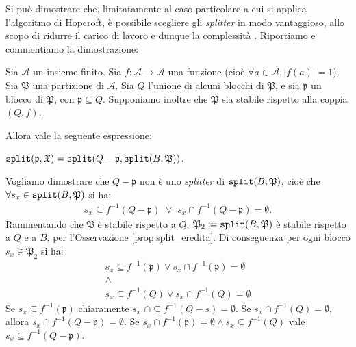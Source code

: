 Si può dimostrare che, limitatamente al caso particolare a cui si applica l'algoritmo di Hopcroft, è possibile scegliere gli \emph{splitter} in modo vantaggioso, allo scopo di ridurre il carico di lavoro e dunque la complessità \cite{hopcroft}. Riportiamo e commentiamo la dimostrazione:
\begin{proposition}
    \label{prop:process_smaller_half}
    Sia $\mathcal{A}$ un insieme finito. Sia $f : \mathcal{A} \to \mathcal{A}$ una funzione (cioè $\forall a \in \mathcal{A}, |f({a})| = 1$). Sia $\mathfrak{P}$ una partizione di $\mathcal{A}$. Sia $Q$ l'unione di alcuni blocchi di $\mathfrak{P}$, e sia $\mathfrak{p}$ un blocco di $\mathfrak{P}$, con $\mathfrak{p} \subseteq Q$. Supponiamo inoltre che $\mathfrak{P}$ sia stabile rispetto alla coppia $(Q, f)$.

    Allora vale la seguente espressione:
    \begin{center}
        $\texttt{\textup{split}}(\mathfrak{p},\mathfrak{X}) = \texttt{\textup{split}}(Q - \mathfrak{p}, \texttt{\textup{split}}(B,\mathfrak{P}))$.
    \end{center}
\end{proposition}
\begin{proof2}
    Vogliamo dimostrare che $Q - \mathfrak{p}$ non è uno \emph{splitter} di $\texttt{\textup{split}}(B,\mathfrak{P})$, cioè che $\forall s_x \in \texttt{\textup{split}}(B,\mathfrak{P})$ si ha:
    \begin{gather*}
        s_x \subseteq f^{-1}(Q - \mathfrak{p}) \,\,\lor\,\, s_x \cap f^{-1}(Q - \mathfrak{p}) = \emptyset.
    \end{gather*}
    Rammentando che $\mathfrak{P}$ è stabile rispetto a $Q$, $\mathfrak{P}_2 \coloneqq \texttt{\textup{split}}(B,\mathfrak{P})$ è stabile rispetto a $Q$ e a $B$, per l'Osservazione \ref{prop:split_eredita}. Di conseguenza per ogni blocco $s_x \in \mathfrak{P}_2$ si ha:
    \begin{gather*}
        s_x \subseteq f^{-1}(\mathfrak{p}) \lor s_x \cap f^{-1}(\mathfrak{p}) = \emptyset\\
        \land\\
        s_x \subseteq f^{-1}(Q) \lor s_x \cap f^{-1}(Q) = \emptyset
    \end{gather*}
    Se $s_x \subseteq f^{-1}(\mathfrak{p})$ chiaramente $s_x \,\,\cap \subseteq f^{-1}(Q-s) = \emptyset$. Se $s_x \cap f^{-1}(Q) = \emptyset$, allora $s_x \cap f^{-1}(Q - \mathfrak{p}) = \emptyset$. Se $s_x \cap f^{-1}(\mathfrak{p}) = \emptyset \land s_x \subseteq f^{-1}(Q)$ vale $s_x \subseteq f^{-1}(Q - \mathfrak{p})$.
\end{proof2}

